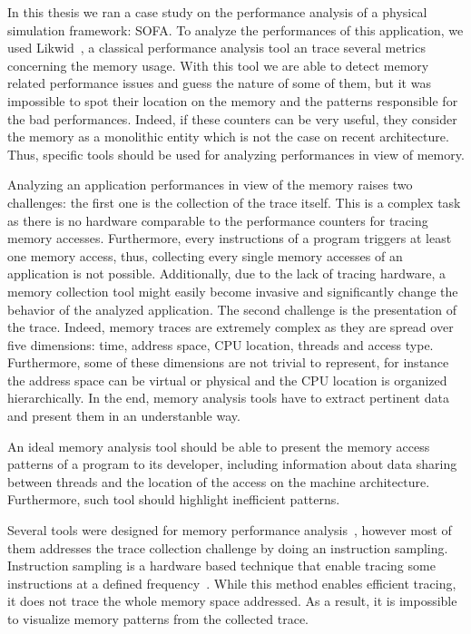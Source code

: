In this thesis we ran a case study on the performance analysis of a physical simulation framework: \gls{SOFA}.
To analyze the performances of this application, we used \gls{Likwid}~\cite{Treibig10LIKWID}, a classical performance analysis tool an trace several metrics concerning the memory usage.
With this tool we are able to detect memory related performance issues and guess the nature of some of them, but it was impossible to spot their location on the memory and the patterns responsible for the bad performances.
Indeed, if these counters can be very useful, they consider the memory as a monolithic entity which is not the case on recent architecture.
Thus, specific tools should be used for analyzing performances in view of memory.

Analyzing an application performances in view of the memory raises two challenges: the first one is the collection of the trace itself.
This is a complex task as there is no hardware comparable to the performance counters for tracing memory accesses.
Furthermore, every instructions of a program triggers at least one memory access, thus, collecting every single memory accesses of an application is not possible.
Additionally, due to the lack of tracing hardware, a memory collection tool might easily become invasive and significantly change the behavior of the analyzed application.
The second challenge is the presentation of the trace.
Indeed, memory traces are extremely complex as they are spread over five dimensions: time, address space, \gls{CPU} location, threads and access type.
Furthermore, some of these dimensions are not trivial to represent, for instance the address space can be virtual or physical and the \gls{CPU} location is organized hierarchically.
In the end, memory analysis tools have to extract pertinent data and present them in an understanble way.

An ideal memory analysis tool should be able to present the memory access patterns of a program to its developer, including information about data sharing between threads and the location of the access on the machine architecture.
Furthermore, such tool should highlight inefficient patterns.

Several tools were designed for memory performance analysis~\cite{Lachaize12MemProf,Liu14Tool,Gimenez14Dissecting}, however most of them addresses the trace collection challenge by doing an instruction sampling.
Instruction sampling is a hardware based technique that enable tracing some instructions at a defined frequency~\cite{Drongowski07Instructionbased,Levinthal09Performance}.
While this method enables efficient tracing, it does not trace the whole memory space addressed.
As a result, it is impossible to visualize memory patterns from the collected trace.

